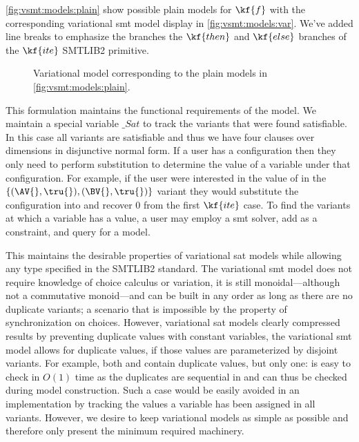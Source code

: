 \autoref{fig:vsmt:models:plain} show possible plain models for $\kf{f}$ with the
corresponding variational \ac{smt} model display in
\autoref{fig:vsmt:models:var}. We've added line breaks to emphasize the branches
the $\kf{then}$ and $\kf{else}$ branches of the $\kf{ite}$ SMTLIB2 primitive.

\begin{figure}[h]
  \centering
  
  \caption{Variational model corresponding to the plain models in
    \autoref{fig:vsmt:models:plain}.}%
  \label{fig:vsmt:models:var}
\end{figure}

This formulation maintains the functional requirements of the model. We maintain
a special variable $\_Sat$ to track the variants that were found satisfiable. In
this case all variants are satisfiable and thus we have four clauses over
dimensions in disjunctive normal form. If a user has a configuration then they
only need to perform substitution to determine the value of a variable under
that configuration. For example, if the user were interested in the value of
\iV{} in the $\{(\AV{}, \tru{}), (\BV{}, \tru{})\}$ variant they would
substitute the configuration into \vc{\iV{}} and recover 0 from the first
$\kf{ite}$ case. To find the variants at which a variable has a value, a user
may employ a \ac{smt} solver, add \vc{\iV{}} as a constraint, and query for a
model.

This maintains the desirable properties of variational \ac{sat} models while
allowing any type specified in the SMTLIB2 standard. The variational \ac{smt}
model does not require knowledge of choice calculus or variation, it is still
monoidal---although not a commutative monoid---and can be built in any order as
long as there are no duplicate variants; a scenario that is impossible by the
property of synchronization on choices. However, variational \ac{sat} models
clearly compressed results by preventing duplicate values with constant
variables, the variational \ac{smt} model allows for duplicate values, if those
values are parameterized by disjoint variants. For example, both \iV{} and \cV{}
contain duplicate values, but only one: \iV{} is easy to check in $O(1)$ time as
the duplicates are sequential in \vc{\iV{}} and can thus be checked during model
construction. Such a case would be easily avoided in an implementation by
tracking the values a variable has been assigned in all variants. However, we
desire to keep variational models as simple as possible and therefore only
present the minimum required machinery.



